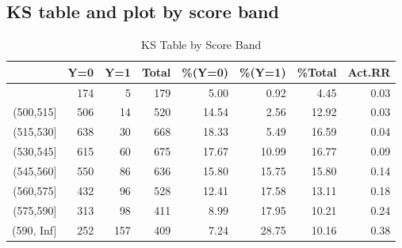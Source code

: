 \documentclass[a4paper]{article}
\begin{document}
\subsection{KS table and plot by score band}  
\begin{table}[ht]
\begin{center}
\begin{tabular}{rrrrrrrr}
  \hline
 & Y=0 & Y=1 & Total & \%(Y=0) & \%(Y=1) & \%Total & Act.RR \\ 
  \hline
[-Inf,500] & 174 & 5 & 179 & 5.00 & 0.92 & 4.45 & 0.03 \\ 
  (500,515] & 506 & 14 & 520 & 14.54 & 2.56 & 12.92 & 0.03 \\ 
  (515,530] & 638 & 30 & 668 & 18.33 & 5.49 & 16.59 & 0.04 \\ 
  (530,545] & 615 & 60 & 675 & 17.67 & 10.99 & 16.77 & 0.09 \\ 
  (545,560] & 550 & 86 & 636 & 15.80 & 15.75 & 15.80 & 0.14 \\ 
  (560,575] & 432 & 96 & 528 & 12.41 & 17.58 & 13.11 & 0.18 \\ 
  (575,590] & 313 & 98 & 411 & 8.99 & 17.95 & 10.21 & 0.24 \\ 
  (590, Inf] & 252 & 157 & 409 & 7.24 & 28.75 & 10.16 & 0.38 \\ 
   \hline
\end{tabular}
\caption{KS Table by Score Band}
\end{center}
\end{table}
\end{document}
